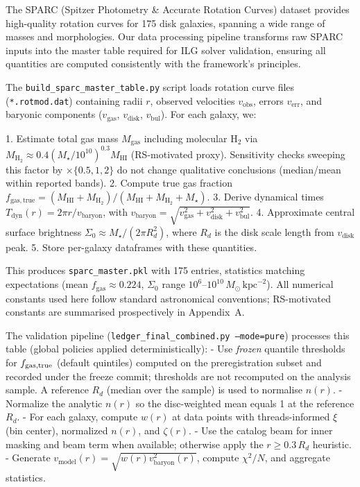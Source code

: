 \documentclass[usenatbib]{mnras}
\begin{document}
The SPARC (Spitzer Photometry \& Accurate Rotation Curves) dataset provides high-quality rotation curves for 175 disk galaxies, spanning a wide range of masses and morphologies. Our data processing pipeline transforms raw SPARC inputs into the master table required for ILG solver validation, ensuring all quantities are computed consistently with the framework's principles.

The \texttt{build\_sparc\_master\_table.py} script loads rotation curve files (\texttt{*.rotmod.dat}) containing radii $r$, observed velocities $v_\mathrm{obs}$, errors $v_\mathrm{err}$, and baryonic components ($v_\mathrm{gas}$, $v_\mathrm{disk}$, $v_\mathrm{bul}$). For each galaxy, we:

1. Estimate total gas mass $M_\mathrm{gas}$ including molecular H$_2$ via $M_\mathrm{H_2} \approx 0.4 (M_\star / 10^{10})^{0.3} M_\mathrm{HI}$ (RS-motivated proxy). Sensitivity checks sweeping this factor by $\times\{0.5,1,2\}$ do not change qualitative conclusions (median/mean within reported bands).
2. Compute true gas fraction $f_\mathrm{gas,true} = (M_\mathrm{HI} + M_\mathrm{H_2}) / (M_\mathrm{HI} + M_\mathrm{H_2} + M_\star)$.
3. Derive dynamical times $T_\mathrm{dyn}(r) = 2\pi r / v_\mathrm{baryon}$, with $v_\mathrm{baryon} = \sqrt{v_\mathrm{gas}^2 + v_\mathrm{disk}^2 + v_\mathrm{bul}^2}$.
4. Approximate central surface brightness $\Sigma_0 \approx M_\star / (2\pi R_d^2)$, where $R_d$ is the disk scale length from $v_\mathrm{disk}$ peak.
5. Store per-galaxy dataframes with these quantities.

This produces \texttt{sparc\_master.pkl} with 175 entries, statistics matching expectations (mean $f_\mathrm{gas} \approx 0.224$, $\Sigma_0$ range $10^6$--$10^{10}\,M_\odot\,\mathrm{kpc}^{-2}$). All numerical constants used here follow standard astronomical conventions; RS-motivated constants are summarised prospectively in Appendix~A.

The validation pipeline (\texttt{ledger\_final\_combined.py --mode=pure}) processes this table (global policies applied deterministically):
- Use \emph{frozen} quantile thresholds for $f_{\rm gas,true}$ (default quintiles) computed on the preregistration subset and recorded under the freeze commit; thresholds are not recomputed on the analysis sample. A reference $R_d$ (median over the sample) is used to normalise $n(r)$.
- Normalize the analytic $n(r)$ so the disc-weighted mean equals 1 at the reference $R_d$.
- For each galaxy, compute $w(r)$ at data points with threads-informed $\xi$ (bin center), normalized $n(r)$, and $\zeta(r)$.
- Use the catalog beam for inner masking and beam term when available; otherwise apply the $r\ge0.3\,R_d$ heuristic.
- Generate $v_\mathrm{model}(r) = \sqrt{w(r) v_\mathrm{baryon}^2(r)}$, compute $\chi^2/N$, and aggregate statistics.
\end{document}
